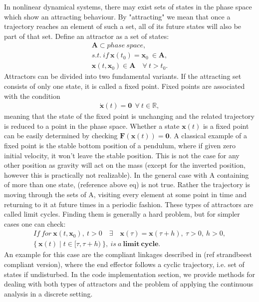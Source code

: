     In nonlinear dynamical systems, there may exist sets of states in the phase space which show an attracting behaviour. By "attracting" we mean that once a trajectory reaches an element of such a set, all of its future states will also be part of that set. Define an attractor as a set of states:
    \begin{gather} \mathbf{A} \subset phase\ space,\\ s.t.\ if \ \mathbf{x}(t_0) = \mathbf{x}_0\ \in \mathbf{A}, \\ \mathbf{x}(t,\mathbf{x}_0) \in \mathbf{A}\quad \forall\ t > t_0. \label{eq:2} \end{gather}
    Attractors can be divided into two fundamental variants.
    If the attracting set consists of only one state, it is called a fixed point. Fixed points are associated with the condition
    \begin{gather}  \dot{\mathbf{x}}(t) = \mathbf{0}\ \ \forall \ t \in \mathbb{R}, \label{eq:3} \end{gather}
    meaning that the state of the fixed point is unchanging and the related trajectory is reduced to a point in the phase space. Whether a state $\mathbf{x}(t)$ is a fixed point can be easily determined by checking $\mathbf{F}(\mathbf{x}(t)) = \mathbf{0}$. A classical example of a fixed point is the stable bottom position of a pendulum, where if given zero initial velocity, it won't leave the stable position. This is not the case for any other position as gravity will act on the mass (except for the inverted position, however this is practically not realizable).
    In the general case with A containing of more than one state, (reference above eq) is not true. Rather the trajectory is moving through the sets of A, visiting every element at some point in time and returning to it at future times in a periodic fashion. These types of attractors are called limit cycles. Finding them is generally a hard problem, but for simpler cases one can check:
    \begin{gather} If\ for \ \mathbf{x}(t,\mathbf{x}_0) ,\ t > 0 \quad \exists \quad \mathbf{x}(\tau) = \mathbf{x}(\tau + h),\ \tau > 0,\ h > 0, \\ \{\ \mathbf{x}(t) \mid t \in [\tau,\tau + h)\ \}, \ is \ a\ \mathbf{limit\ cycle}.\label{eq:4} \end{gather}
    An example for this case are the compliant linkages described in (ref strandbeest compliant version), where the end effector follows a cyclic trajectory, i.e. set of states if undisturbed. 
    In the code implementation section, we provide methods for dealing with both types of attractors and the problem of applying the continuous analysis in a discrete setting. 


